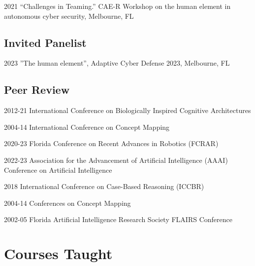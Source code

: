 \documentclass[12pt,letterpaper]{report}
\begin{document}
    \begin{tablist}

        \item[2021] \tab{}\enquote{Challenges in Teaming.} CAE-R Workshop on the human element in autonomous cyber security, Melbourne, FL

    \end{tablist}

    \subsection*{Invited Panelist}
    \begin{tablist}
      \item[2023] \tab{}''The human element'', Adaptive Cyber Defense 2023, Melbourne, FL
    \end{tablist}

    \subsection*{Peer Review}

    \begin{tablist}
        \item[2012-21] \tab{}International Conference on Biologically Inspired Cognitive Architectures
        \item[2004-14] \tab{}International Conference on Concept Mapping
        \item[2020-23] \tab{}Florida Conference on Recent Advances in Robotics (FCRAR)
        \item[2022-23] \tab{}Association for the Advancement of Artificial Intelligence (AAAI) Conference on Artificial Intelligence
        \item[2018] \tab{}International Conference on Case-Based Reasoning (ICCBR)
        \item[2004-14] \tab{}Conferences on Concept Mapping 
        \item[2002-05] \tab{}Florida Artificial Intelligence Research Society FLAIRS Conference
    \end{tablist}


    \section*{Courses Taught}
\end{document}
